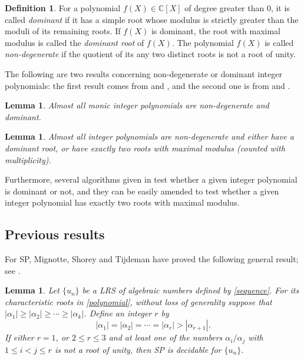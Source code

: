 \documentclass[12pt]{amsart}
\newtheorem{lemma}[theorem]{Lemma}
\theoremstyle{definition}
\newtheorem{definition}[theorem]{Definition}
\theoremstyle{remark}
\numberwithin{equation}{section}
\begin{document}
\begin{definition}
For a polynomial $f(X)\in {{\mathbb C}}[X]$ of degree greater than 0, it is called \emph{dominant} if
it has a simple root whose modulus is strictly greater than the moduli of its remaining roots.
If $f(X)$ is dominant, the root with maximal modulus is called the \emph{dominant root} of $f(X)$. 
The polynomial $f(X)$ is called {\em non-degenerate} if
the quotient of its any two distinct roots is not a root of unity.
\end{definition}

The following are two results concerning non-degenerate or dominant  integer polynomials: the first result comes from \cite[Theorem 1.1]{DS1} and \cite[Theorem 1.1]{DS2}, and the second one is from \cite[Theorem 1.4]{DS1} and \cite[Theorem 1.1]{DS3}.

\begin{lemma}
\label{lem:monic}
Almost all monic integer polynomials are non-degenerate and dominant.
\end{lemma}

\begin{lemma}
\label{lem:poly}
Almost all integer polynomials are non-degenerate and either have a dominant root, or have exactly two roots with maximal modulus (counted with multiplicity).
\end{lemma}

Furthermore, several algorithms given in \cite{DS2} test whether a given integer polynomial is dominant or not, and they can be easily amended to test whether a given integer polynomial has exactly two roots with maximal modulus.

\subsection{Previous results}

For SP, Mignotte, Shorey and Tijdeman have proved the following general result; see \cite[Corollary 1]{MST}.

\begin{lemma}
\label{lem:MST}
Let $\{u_n\}$ be a LRS of algebraic numbers defined by \eqref{sequence}.
For its characteristic roots in \eqref{polynomial}, without loss of generality suppose that $|{\alpha}_1|\ge |{\alpha}_2|\ge \cdots \ge |{\alpha}_k|$.
Define an integer $r$ by
$$
|{\alpha}_1|=|{\alpha}_2|=\cdots=|{\alpha}_r|> |{\alpha}_{r+1}|.
$$
If either $r=1$, or $2\le r \le 3$ and at least one of the numbers ${\alpha}_i/{\alpha}_j$ with $1\le i < j \le r$ is not a root of unity, then SP is decidable for $\{u_n\}$.
\end{lemma}
\end{document}
